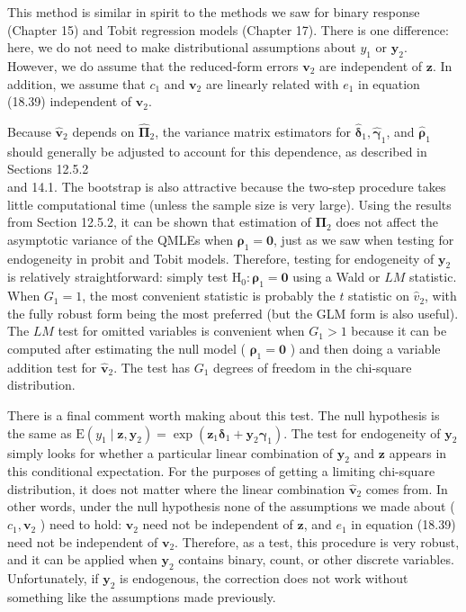 \documentclass[10pt]{article}
\begin{document}
This method is similar in spirit to the methods we saw for binary response (Chapter 15) and Tobit regression models (Chapter 17). There is one difference: here, we do not need to make distributional assumptions about $y_{1}$ or $\mathbf{y}_{2}$. However, we do assume that the reduced-form errors $\mathbf{v}_{2}$ are independent of $\mathbf{z}$. In addition, we assume that $c_{1}$ and $\mathbf{v}_{2}$ are linearly related with $e_{1}$ in equation (18.39) independent of $\mathbf{v}_{2}$.

Because $\hat{\mathbf{v}}_{2}$ depends on $\hat{\boldsymbol{\Pi}}_{2}$, the variance matrix estimators for $\hat{\boldsymbol{\delta}}_{1}, \hat{\boldsymbol{\gamma}}_{1}$, and $\hat{\boldsymbol{\rho}}_{1}$ should generally be adjusted to account for this dependence, as described in Sections 12.5.2\\
and 14.1. The bootstrap is also attractive because the two-step procedure takes little computational time (unless the sample size is very large). Using the results from Section 12.5.2, it can be shown that estimation of $\boldsymbol{\Pi}_{2}$ does not affect the asymptotic variance of the QMLEs when $\boldsymbol{\rho}_{1}=\mathbf{0}$, just as we saw when testing for endogeneity in probit and Tobit models. Therefore, testing for endogeneity of $\mathbf{y}_{2}$ is relatively straightforward: simply test $\mathrm{H}_{0}: \boldsymbol{\rho}_{1}=\mathbf{0}$ using a Wald or $L M$ statistic. When $G_{1}=1$, the most convenient statistic is probably the $t$ statistic on $\hat{v}_{2}$, with the fully robust form being the most preferred (but the GLM form is also useful). The $L M$ test for omitted variables is convenient when $G_{1}>1$ because it can be computed after estimating the null model ( $\boldsymbol{\rho}_{1}=\mathbf{0}$ ) and then doing a variable addition test for $\hat{\mathbf{v}}_{2}$. The test has $G_{1}$ degrees of freedom in the chi-square distribution.

There is a final comment worth making about this test. The null hypothesis is the same as $\mathrm{E}\left(y_{1} \mid \mathbf{z}, \mathbf{y}_{2}\right)=\exp \left(\mathbf{z}_{1} \boldsymbol{\delta}_{1}+\mathbf{y}_{2} \boldsymbol{\gamma}_{1}\right)$. The test for endogeneity of $\mathbf{y}_{2}$ simply looks for whether a particular linear combination of $\mathbf{y}_{2}$ and $\mathbf{z}$ appears in this conditional expectation. For the purposes of getting a limiting chi-square distribution, it does not matter where the linear combination $\hat{\mathbf{v}}_{2}$ comes from. In other words, under the null hypothesis none of the assumptions we made about ( $c_{1}, \mathbf{v}_{2}$ ) need to hold: $\mathbf{v}_{2}$ need not be independent of $\mathbf{z}$, and $e_{1}$ in equation (18.39) need not be independent of $\mathbf{v}_{2}$. Therefore, as a test, this procedure is very robust, and it can be applied when $\mathbf{y}_{2}$ contains binary, count, or other discrete variables. Unfortunately, if $\mathbf{y}_{2}$ is endogenous, the correction does not work without something like the assumptions made previously.
\end{document}
